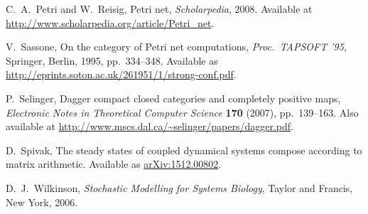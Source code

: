 \documentclass{compositionalityarticle}
\theoremstyle{plain}
\theoremstyle{remark}
\begin{document}
\begin{thebibliography}{9}
C.\ A.\ Petri and W.\ Reisig, Petri net, \textsl{Scholarpedia}, 2008.  Available at
\href{http://www.scholarpedia.org/article/Petri\_net}{http://www.scholarpedia.org/article/Petri\_net}.

 V.\ Sassone, On the category of Petri net computations, \textsl{Proc.\ TAPSOFT '95}, Springer, Berlin, 1995, pp.\ 334--348. Available as \href{http://eprints.soton.ac.uk/261951/1/strong-conf.pdf}{http://eprints.soton.ac.uk/261951/1/strong-conf.pdf}.

 P.\ Selinger, Dagger compact closed categories and completely
 positive maps, \textsl{Electronic Notes in Theoretical Computer Science} \textbf{170} (2007), pp.\ 139--163.   Also available at \href{http://www.mscs.dal.ca/~selinger/papers/dagger.pdf}{http://www.mscs.dal.ca/\~{}selinger/papers/dagger.pdf}.

 D.\ Spivak, The steady states of coupled dynamical systems compose according to matrix arithmetic.  Available as \href{https://arxiv.org/abs/1512.00802}{arXiv:1512.00802}.

 D.\ J.\ Wilkinson, \textsl{Stochastic Modelling for Systems Biology},
Taylor and Francis, New York, 2006.

\end{thebibliography}
  
\end{document}
